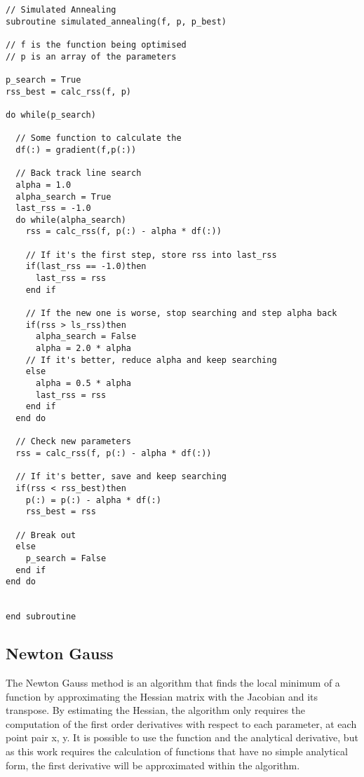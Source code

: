 \begin{lstlisting}[style=sPseudo,caption={Simple simulated annealing subroutine}]
// Simulated Annealing
subroutine simulated_annealing(f, p, p_best)

// f is the function being optimised
// p is an array of the parameters

p_search = True
rss_best = calc_rss(f, p)

do while(p_search)

  // Some function to calculate the 
  df(:) = gradient(f,p(:))
  
  // Back track line search
  alpha = 1.0  
  alpha_search = True
  last_rss = -1.0
  do while(alpha_search)
    rss = calc_rss(f, p(:) - alpha * df(:))
    
    // If it's the first step, store rss into last_rss
    if(last_rss == -1.0)then
      last_rss = rss
    end if
    
    // If the new one is worse, stop searching and step alpha back
    if(rss > ls_rss)then
      alpha_search = False
      alpha = 2.0 * alpha
    // If it's better, reduce alpha and keep searching
    else
      alpha = 0.5 * alpha
      last_rss = rss      
    end if 
  end do
  
  // Check new parameters
  rss = calc_rss(f, p(:) - alpha * df(:))
  
  // If it's better, save and keep searching
  if(rss < rss_best)then
    p(:) = p(:) - alpha * df(:)
    rss_best = rss
  
  // Break out
  else
    p_search = False
  end if
end do


end subroutine
\end{lstlisting}

\subsection{Newton Gauss}

The Newton Gauss method is an algorithm that finds the local minimum of a function by approximating the Hessian matrix with the Jacobian and its transpose.  By estimating the Hessian, the algorithm only requires the computation of the first order derivatives with respect to each parameter, at each point pair x, y.  It is possible to use the function and the analytical derivative, but as this work requires the calculation of functions that have no simple analytical form, the first derivative will be approximated within the algorithm.

\eqNewtonGauss

